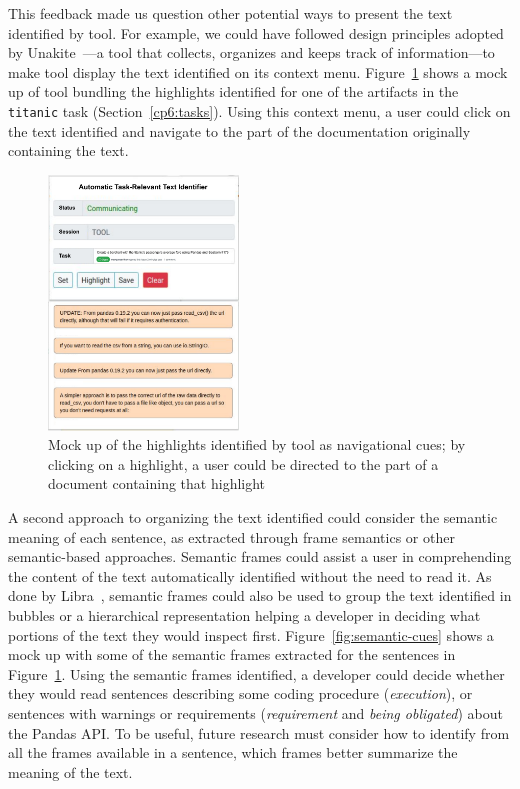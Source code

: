\smallskip
This feedback made us question other potential ways to present the text identified by \acs{tool}.
For example, we could have followed design principles adopted by Unakite~\cite{Liu2018Unakite}---a tool that collects, organizes and keeps track of information---to make \acs{tool} display the text identified on its context menu.
Figure~\ref{fig:navigational-cues} shows a mock up of \acs{tool} bundling the highlights identified for one of the artifacts in the \texttt{titanic} task (Section~\ref{cp6:tasks}).
Using this context menu, a user could click on the text identified and navigate to the part of the documentation 
originally containing the text.



\begin{figure}[H]
    \centering
    \includegraphics[width=0.45\textwidth]{fig/cp7/navigational-cues}
    \caption{Mock up of the highlights identified by \acs{tool} as navigational cues; by clicking on a highlight, a user could be directed to the part of a document containing that highlight}
    \label{fig:navigational-cues}
\end{figure}



A second approach to organizing the text identified could consider 
the semantic meaning of each sentence, as extracted through frame semantics or other semantic-based approaches. 
Semantic frames could 
assist a user in comprehending the content of the text automatically identified
without the need to read it. 
As done by Libra~\cite{Ponzanelli2017}, semantic frames could also be used to group the text identified in bubbles or a hierarchical representation 
 helping a developer
in deciding what portions of the text they would inspect first. 
Figure~\ref{fig:semantic-cues} shows a mock up 
with some of the semantic frames extracted 
for the sentences in Figure~\ref{fig:navigational-cues}.
Using the semantic frames identified,
a developer could decide whether they would read sentences 
describing some coding procedure (\textit{execution}), or sentences 
with warnings or requirements (\textit{requirement} and \textit{being obligated})
about the Pandas API. 
To be useful, future research must consider how to identify from all the frames available in a sentence, 
which frames
better summarize the meaning of the text. 


